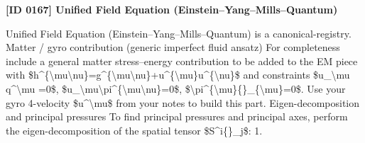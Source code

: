\clearpage
\noindent\textbf{[ID 0167] Unified Field Equation (Einstein--Yang--Mills--Quantum)}\par
\vspace{0.35em}
\begingroup\small
{}
Unified Field Equation (Einstein--Yang--Mills--Quantum) is a canonical-registry. Matter / gyro contribution (generic imperfect fluid ansatz) For completeness include a general matter stress--energy contribution to be added to the EM piece with \$h\textasciicircum{}\{\textbackslash{}mu\textbackslash{}nu\}=g\textasciicircum{}\{\textbackslash{}mu\textbackslash{}nu\}+u\textasciicircum{}\{\textbackslash{}mu\}u\textasciicircum{}\{\textbackslash{}nu\}\$ and constraints \$u\_\textbackslash{}mu q\textasciicircum{}\textbackslash{}mu =0\$, \$u\_\textbackslash{}mu\textbackslash{}pi\textasciicircum{}\{\textbackslash{}mu\textbackslash{}nu\}=0\$, \$\textbackslash{}pi\textasciicircum{}\{\textbackslash{}mu\}\{\}\_\{\textbackslash{}mu\}=0\$. Use your gyro 4-velocity \$u\textasciicircum{}\textbackslash{}mu\$ from your notes to build this part. Eigen-decomposition and principal pressures To find principal pressures and principal axes, perform the eigen-decomposition of the spatial tensor \$S\textasciicircum{}i\{\}\_j\$: 1.

